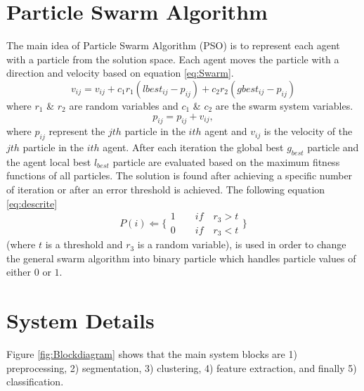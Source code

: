 \documentclass[a4paper,10pt]{IEEEconf}
\begin{document}
\section{Particle Swarm Algorithm}
\label{PSO}
The main idea of Particle Swarm Algorithm (PSO) is to represent each agent with a particle from the solution space. Each agent moves the particle with a direction and velocity based on equation \ref{eq:Swarm}.
 \begin{equation}
v_{ij}  = v_{ij}  + c_1 r_1 (lbest_{ij}  - p_{ij} ) + c_2 r_2 (gbest_{ij}  - p_{ij} )
\label{eq:Swarm}
\end{equation}
 where $r_1$ \& $r_2$ are random variables and $c_1$ \& $c_2$ are the swarm system variables.
\begin{equation}
p_{ij}=p_{ij}+v_{ij},
\end{equation}
where $p_{ij}$ represent the $jth$ particle in the $ith$ agent and $v_{ij}$ is the velocity of the $jth$ particle in the $ith$ agent. After each iteration the global best $g_{best}$ particle and the agent local best $l_{best}$ particle are evaluated based on the maximum fitness functions of all particles. The solution is found after achieving a specific number of iteration or after an error threshold is achieved.
The following equation \ref{eq:descrite}  
\begin{equation}
   P(i)\Leftarrow 
\{
\begin{array}{c} 
1 \quad \quad if\quad r_{3}>t  \\

0 \quad \quad if\quad r_{3}<t 
\label{eq:descrite}
\end{array}\}
\end{equation}
 (where $t$ is a threshold and $r_{3}$ is a random variable), is used in order to change the general swarm algorithm into binary particle which handles particle values of either $0$ or $1$. 
    
\section{System Details}
\label{Sysdisc}
Figure \ref{fig:Blockdiagram} shows that the main system blocks are 1) preprocessing, 2) segmentation, 3) clustering, 4) feature extraction, and finally 5) classification. 
\end{document}
